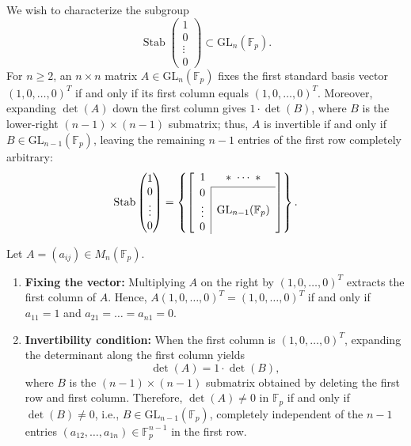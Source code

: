 \begin{content}
We wish to characterize the subgroup
\[
\operatorname{Stab}\begin{pmatrix} 1 \\ 0 \\ \vdots \\ 0 \end{pmatrix} \subset \mathrm{GL}_n(\mathbb{F}_p).
\]
For $n \ge 2$, an $n \times n$ matrix $A \in \mathrm{GL}_n(\mathbb{F}_p)$ fixes the first standard basis vector $(1, 0, \dots, 0)^T$ if and only if its first column equals $(1, 0, \dots, 0)^T$. Moreover, expanding $\det(A)$ down the first column gives $1 \cdot \det(B)$, where $B$ is the lower-right $(n-1) \times (n-1)$ submatrix; thus, $A$ is invertible if and only if $B \in \mathrm{GL}_{n-1}(\mathbb{F}_p)$, leaving the remaining $n-1$ entries of the first row completely arbitrary:
\begin{equation}\label{eq:stab-block-matrix}
\operatorname{Stab}\begin{pmatrix} 1 \\ 0 \\ \vdots \\ 0 \end{pmatrix} = \left\{ \left[ \begin{array}{c|c} \multicolumn{1}{c}{1} & \ast \ \cdots \ \ast \\[2pt] \cline{2-2} \begin{matrix} 0 \\ \vdots \\ 0 \end{matrix} & \mathrm{GL}_{n-1}(\mathbb{F}_p) \end{array} \right] \right\}.
\end{equation}

\begin{steps}
Let $A = (a_{ij}) \in M_n(\mathbb{F}_p)$.
\begin{enumerate}[label=\textbf{\arabic*.}]
    \item \textbf{Fixing the vector:} Multiplying $A$ on the right by $(1, 0, \dots, 0)^T$ extracts the first column of $A$. Hence, $A(1, 0, \dots, 0)^T = (1, 0, \dots, 0)^T$ if and only if $a_{11} = 1$ and $a_{21} = \dots = a_{n1} = 0$.
    \item \textbf{Invertibility condition:} When the first column is $(1, 0, \dots, 0)^T$, expanding the determinant along the first column yields
    \[
    \det(A) = 1 \cdot \det(B),
    \]
    where $B$ is the $(n-1) \times (n-1)$ submatrix obtained by deleting the first row and first column. Therefore, $\det(A) \neq 0$ in $\mathbb{F}_p$ if and only if $\det(B) \neq 0$, i.e., $B \in \mathrm{GL}_{n-1}(\mathbb{F}_p)$, completely independent of the $n-1$ entries $(a_{12}, \dots, a_{1n}) \in \mathbb{F}_p^{n-1}$ in the first row.
\end{enumerate}
\end{steps}
\end{content}

